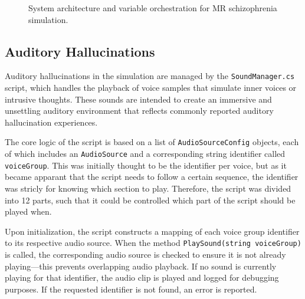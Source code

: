 \begin{landscape}
\begin{figure}[p]
%

\caption{System architecture and variable orchestration for MR schizophrenia simulation.}
\label{fig:orchestrator_diagram}
\end{figure}
\end{landscape}


\subsection{Auditory Hallucinations}

Auditory hallucinations in the simulation are managed by the \texttt{SoundManager.cs} script, which handles the playback of voice samples that simulate inner voices or intrusive thoughts. These sounds are intended to create an immersive and unsettling auditory environment that reflects commonly reported auditory hallucination experiences.

The core logic of the script is based on a list of \texttt{AudioSourceConfig} objects, each of which includes an \texttt{AudioSource} and a corresponding string identifier called \texttt{voiceGroup}. This was initially thought to be the identifier per voice, but as it became apparant that the script needs to follow a certain sequence, the identifier was stricly for knowing which section to play. Therefore, the script was divided into 12 parts, such that it could be controlled which part of the script should be played when. 

Upon initialization, the script constructs a mapping of each voice group identifier to its respective audio source. When the method \texttt{PlaySound(string voiceGroup)} is called, the corresponding audio source is checked to ensure it is not already playing—this prevents overlapping audio playback. If no sound is currently playing for that identifier, the audio clip is played and logged for debugging purposes. If the requested identifier is not found, an error is reported.

